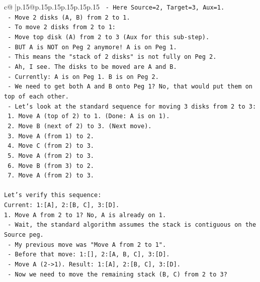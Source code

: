 \documentclass{article}
\begin{document}
{\begin{supertabular}{c@{$\;$}|p{.15\linewidth}@{}p{.15\linewidth}p{.15\linewidth}p{.15\linewidth}p{.15\linewidth}p{.15\linewidth}}
{{{\texttt{   {-} Here Source=2, Target=3, Aux=1.} \\
\texttt{   {-} Move 2 disks (A, B) from 2 to 1.} \\
\texttt{   {-} To move 2 disks from 2 to 1:} \\
\texttt{     {-} Move top disk (A) from 2 to 3 (Aux for this sub{-}step).} \\
\texttt{       {-} BUT A is NOT on Peg 2 anymore! A is on Peg 1.} \\
\texttt{       {-} This means the "stack of 2 disks" is not fully on Peg 2.} \\
\texttt{       {-} Ah, I see. The disks to be moved are A and B.} \\
\texttt{       {-} Currently: A is on Peg 1. B is on Peg 2.} \\
\texttt{       {-} We need to get both A and B onto Peg 1? No, that would put them on top of each other.} \\
\texttt{       {-} Let's look at the standard sequence for moving 3 disks from 2 to 3:} \\
\texttt{         1. Move A (top of 2) to 1. (Done: A is on 1).} \\
\texttt{         2. Move B (next of 2) to 3. (Next move).} \\
\texttt{         3. Move A (from 1) to 2.} \\
\texttt{         4. Move C (from 2) to 3.} \\
\texttt{         5. Move A (from 2) to 3.} \\
\texttt{         6. Move B (from 3) to 2.} \\
\texttt{         7. Move A (from 2) to 3.} \\
\\ 
\texttt{Let's verify this sequence:} \\
\texttt{Current: 1:{[}A{]}, 2:{[}B, C{]}, 3:{[}D{]}.} \\
\texttt{1. Move A from 2 to 1? No, A is already on 1.} \\
\texttt{   {-} Wait, the standard algorithm assumes the stack is contiguous on the Source peg.} \\
\texttt{   {-} My previous move was "Move A from 2 to 1".} \\
\texttt{   {-} Before that move: 1:{[}{]}, 2:{[}A, B, C{]}, 3:{[}D{]}.} \\
\texttt{   {-} Move A (2{-}>1). Result: 1:{[}A{]}, 2:{[}B, C{]}, 3:{[}D{]}.} \\
\texttt{   {-} Now we need to move the remaining stack (B, C) from 2 to 3?} \\
}}}
\end{supertabular}}
\end{document}
